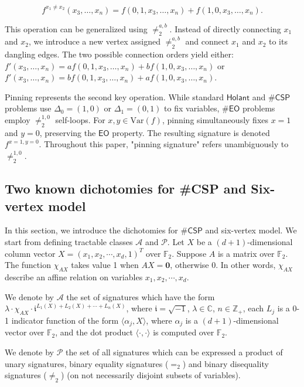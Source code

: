 \documentclass[a4paper,UKenglish,cleveref, autoref, thm-restate]{lipics-v2021}
\newcommand{\bi}[2]{\neq_2^{#1,#2}}
\newcommand{\hol}[0]{\textsf{Holant}}
\newcommand{\eo}[0]{\textsf{EO}}
\newcommand{\csp}[0]{\textsf{CSP}}
\begin{document}
$$f^{x_1\neq x_2}(x_3,\ldots,x_n)=f(0,1,x_3,\ldots,x_n)+f(1,0,x_3,\ldots,x_n).$$

This operation can be generalized using $\bi{a}{b}$. Instead of directly connecting $x_1$ and $x_2$, we introduce a new vertex assigned $\bi{a}{b}$ and connect $x_1$ and $x_2$ to its dangling edges.
The two possible connection orders yield either:
$f'(x_3,\ldots,x_n)=af(0,1,x_3,\ldots,x_n)+bf(1,0,x_3,\ldots,x_n)$
or
$f'(x_3,\ldots,x_n)=bf(0,1,x_3,\ldots,x_n)+af(1,0,x_3,\ldots,x_n)$.

Pinning represents the second key operation. While standard $\hol$ and $\#\csp$ problems use $\Delta_0=(1,0)$ or $\Delta_1=(0,1)$ to fix variables, $\#\eo$ problems employ $\bi{1}{0}$ self-loops. For $x,y\in\text{Var}(f)$, pinning simultaneously fixes $x=1$ and $y=0$, preserving the $\eo$ property. The resulting signature is denoted $f^{x=1,y=0}$. Throughout this paper, "pinning signature" refers unambiguously to $\bi{1}{0}$.

\subsection{Two known dichotomies for \#CSP and Six-vertex model} \label{sixvertexchapter}


In this section, we introduce the dichotomies for $\#\csp$ and six-vertex model. We start from defining tractable classes $\mathscr{A}$ and $\mathscr{P}$. 
Let $X$ be a $(d+1)$-dimensional column vector $X=(x_1,x_2,\cdots,x_d,1)^T$ over $\mathbb{F}_2$. Suppose $A$ is a matrix over $\mathbb{F}_2$. The function $\chi_{AX}$ takes value 1 when $AX=\mathbf{0}$, otherwise 0. In other words, $\chi_{AX}$ describe an affine relation on variables $x_1,x_2,\cdots,x_d$.

\begin{definition}
    We denote by $\mathscr{A}$ the set of signatures which have the form $\lambda\cdot\chi_{AX}\cdot\mathfrak{i}^{L_1(X)+L_2(X)+\cdots+L_n(X)}$, where $\mathfrak{i}=\sqrt{-1}$, $\lambda\in\mathbb{C}$, $n\in\mathbb{Z}_+$, each $L_j$ is a 0-1 indicator function of the form $\langle \alpha_j,X \rangle$, where $\alpha_j$ is a $(d+1)$-dimensional vector over $\mathbb{F}_2$, and the dot product $\langle \cdot,\cdot \rangle$ is computed over $\mathbb{F}_2$.
\end{definition}



\begin{definition}
    We denote by $\mathscr{P}$ the set of all signatures which can be expressed a product of unary signatures, binary equality signatures ($=_2$) and binary disequality signatures ($\neq_2$) (on not necessarily disjoint subsets of variables). 
\end{definition}
\end{document}
